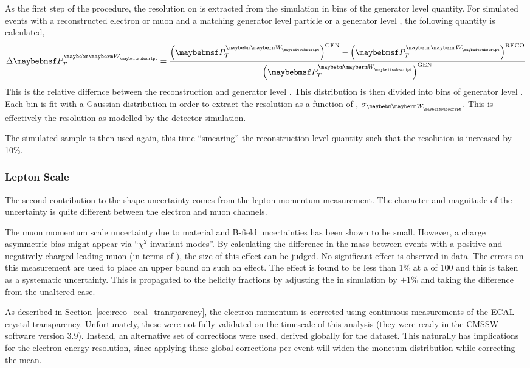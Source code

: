 As the first step of the procedure, the resolution on \PtW is extracted from the
simulation in bins of the generator level \PtW quantity. For simulated \Wjets
events with a reconstructed electron or muon and a matching generator level
particle or a generator level \Ptau, the following quantity is calculated,
\begin{equation}
\Delta\PtW = \frac{\left(\PtW\right)^{\textrm{GEN}} - \left ( \PtW \right)^{\textrm{RECO}}}{\left(\PtW\right)^{\textrm{GEN}}}
\end{equation}
This is the relative differnce between the reconstruction and generator level
\PtW. This distribution is then divided into bins of generator level \PtW. Each
bin is fit with a Gaussian distribution in order to extract the resolution as a
function of \PtW, $\sigma_{\PW}$. This is effectively the \PtW resolution as
modelled by the detector simulation.

The simulated sample is then used again, this time ``smearing'' the
reconstruction level \PtW quantity such that the resolution is increased by
10\%.

\subsubsection{Lepton Scale}
The second contribution to the \LP shape uncertainty comes from the lepton
momentum measurement. The character and magnitude of the uncertainty is quite
different between the electron and muon channels.

The muon momentum scale uncertainty due to material and B-field uncertainties
has been shown to be small. However, a charge asymmetric \Pt bias might appear
via ``$\chi^2$ invariant modes''. By calculating the difference in the \PZ mass
between events with a positive and negatively charged leading muon (in terms of
\Pt), the size of this effect can be judged. No significant effect is observed
in data. The errors on this measurement are used to place an upper bound on such
an effect. The effect is found to be less than 1\% at a \Ptmu of
\unit{100}{\GeV} and this is taken as a systematic uncertainty. This is
propagated to the helicity fractions by adjusting the \Ptmu in simulation by
$\pm 1\%$ and taking the difference from the unaltered case.

As described in Section~\ref{sec:reco_ecal_transparency}, the electron momentum is
corrected using continuous measurements of the \ac{ECAL} crystal
transparency. Unfortunately, these were not fully validated on the timescale of
this analysis (they were ready in the \ac{CMSSW} software version 3.9). Instead,
an alternative set of corrections were used, derived globally for the
dataset. This naturally has implications for the electron energy resolution,
since applying these global corrections per-event will widen the monetum
distribution while correcting the mean.

